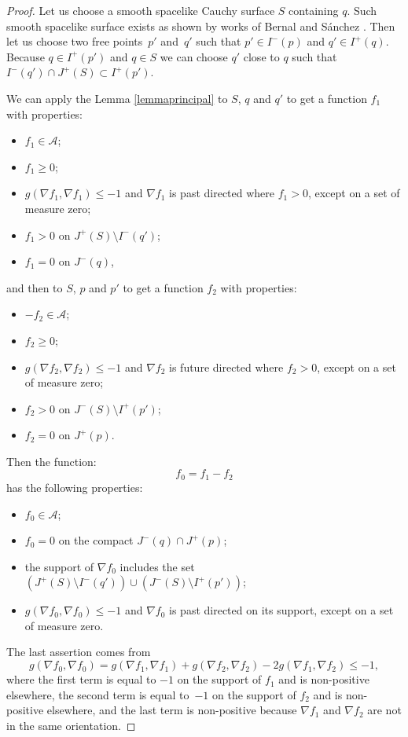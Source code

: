 \documentclass[11pt]{article}
\newcommand{\parenthese}[1]{\left( {#1} \right)}
\begin{document}
\begin{proof}
Let us choose a smooth spacelike Cauchy surface $S$ containing $q$. Such smooth spacelike surface exists as shown by works of Bernal and S\'anchez \cite{BS03,BS04}. Then let us choose two free points~$p'$ and~$q'$ such that $p' \in I^-(p)$ and $q' \in I^+(q)$.  Because $q \in I^+(p')$ and $q\in S$ we can choose $q'$ close to $q$ such that $I^-(q') \cap J^+(S) \subset I^+(p')$.

We can apply the Lemma \ref{lemmaprincipal} to $S$, $q$ and $q'$ to get a function $f_1$ with properties:
\begin{itemize}\itemsep=0pt
\item $f_1 \in \mathcal A$;
\item $f_1 \geq 0 $;
\item $g( \nabla f_1, \nabla f_1 ) \leq -1$ and $\nabla f_1$ is past directed where $f_1 > 0$, except on a set of measure zero;
\item $f _1> 0$ on $J^+(S) \setminus I^-(q')$;
\item $f_1 = 0$ on $J^-(q)$,
\end{itemize}
and then to $S$, $p$ and $p'$ to get a function $f_2$ with properties:
\begin{itemize}\itemsep=0pt
\item $-f_2 \in \mathcal A$;
\item $f_2 \geq 0 $;
\item $g( \nabla f_2, \nabla f_2 ) \leq -1$ and $\nabla f_2$ is future directed where $f_2> 0$, except on a set of measure zero;
\item $f_2 > 0$ on $J^-(S) \setminus I^+(p')$;
\item $f_2 = 0$ on $J^+(p)$.
\end{itemize}

Then the function:
\[
f_0 = f_1 - f_2
\]
has the following properties:
\begin{itemize}\itemsep=0pt
\item $f_0\in\mathcal A$;
\item $f_0 = 0$ on the compact $J^-(q) \cap J^+(p)$;
\item the support of $\nabla f_0$ includes the set $\parenthese{J^+(S) \setminus I^-(q')} \cup  \parenthese{J^-(S) \setminus I^+(p')}$;
\item $g( \nabla f_0, \nabla f_0) \leq -1$ and $\nabla f_0$ is past directed on its support, except on a set of measure zero.
\end{itemize}
The last assertion comes from
\[
g( \nabla f_0, \nabla f_0 ) =  g( \nabla f_1, \nabla f_1 ) + g( \nabla f_2, \nabla f_2 ) -  2 g( \nabla f_1, \nabla f_2 ) \leq -1,
\]
where the f\/irst term is equal to $-1$ on the support of $f_1$ and is non-positive elsewhere, the second term is equal to~$-1$ on the support of $f_2$ and is non-positive elsewhere, and the last term is non-positive because $\nabla f_1$ and $\nabla f_2$ are not in the same orientation.


\end{proof}
\end{document}
